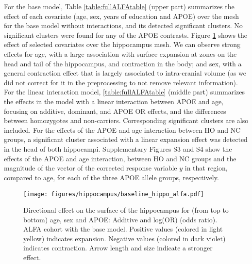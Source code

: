 For the base model, Table \ref{table:fullALFAtable} (upper part) summarizes the effect of each covariate (age, sex, years of education and APOE) over the mesh for the base model without interactions, and its detected significant clusters. No significant clusters were found for any of the APOE contrasts. Figure \ref{fig:alfabaselinefig1} shows the effect of selected covariates over the hippocampus mesh. We can observe strong effects for age, with a large association with surface expansion at zones on the head and tail of the hippocampus, and contraction in the body; and sex, with a general contraction effect that is largely associated to intra-cranial volume (as we did not correct for it in the preprocessing to not remove relevant information). For the linear interaction model, \ref{table:fullALFAtable} (middle part) summarizes the effects in the model with a linear interaction between APOE and age, focusing on additive, dominant, and APOE OR effects, and the differences between homozygotes and non-carriers. Corresponding significant clusters are also included. For the effects of the APOE and age interaction between HO and NC groups, a significant cluster associated with a linear expansion effect was detected in the head of both hippocampi. Supplementary Figures S3 and S4 show the effects of the APOE and age interaction, between HO and NC groups and the magnitude of the vector of the corrected response variable $y$ in that region, compared to age, for each of the three APOE allele groups, respectively.  \\

\begin{figure}[htbp]
  \centering
  \texttt{[image: figures/hippocampus/baseline\_hippo\_alfa.pdf]}
  \caption[Directional effect on the surface of the hippocampus, ALFA cohort.]{Directional effect on the surface of the hippocampus for (from top to bottom) age, sex and APOE: Additive and log(OR) (odds ratio). ALFA cohort with the base model. Positive values (colored in light yellow) indicates expansion. Negative values (colored in dark violet) indicates contraction. Arrow length and size indicate a stronger effect.}\label{fig:alfabaselinefig1}
\end{figure}

